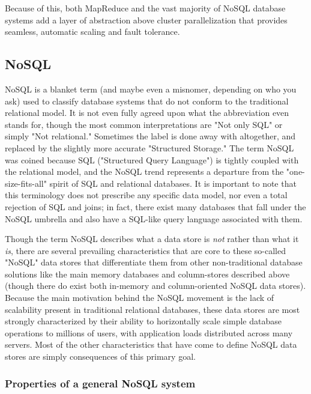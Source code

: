 \documentclass[11pt,a4paper]{report}
\begin{document}
Because of this, both MapReduce and the vast majority of NoSQL database systems add a layer of abstraction above cluster parallelization that provides seamless, automatic scaling and fault tolerance.
\subsection*{NoSQL}
NoSQL is a blanket term (and maybe even a misnomer, depending on who you ask) used to classify database systems that do not conform to the traditional relational model. It is not even fully agreed upon what the abbreviation even stands for, though the most common interpretations are "Not only SQL" or simply "Not relational."\cite{cattell2011scalable} Sometimes the label is done away with altogether, and replaced by the slightly more accurate "Structured Storage." The term NoSQL was coined because SQL ("Structured Query Language") is tightly coupled with the relational model, and the NoSQL trend represents a departure from the "one-size-fits-all" spirit of SQL and relational databases. It is important to note that this terminology does not prescribe any specific data model, nor even a total rejection of SQL and joins; in fact, there exist many databases that fall under the NoSQL umbrella and also have a SQL-like query language associated with them. 

Though the term NoSQL describes what a data store is \textit{not} rather than what it \textit{is}, there are several prevailing characteristics that are core to these so-called "NoSQL" data stores that differentiate them from other non-traditional database solutions like the main memory databases and column-stores described above (though there do exist both in-memory and column-oriented NoSQL data stores). Because the main motivation behind the NoSQL movement is the lack of scalability present in traditional relational databases, these data stores are most strongly characterized by their ability to horizontally scale simple database operations to millions of users, with application loads distributed across many servers.\cite{strauch2011nosql} Most of the other characteristics that have come to define NoSQL data stores are simply consequences of this primary goal.

\subsubsection{Properties of a  general NoSQL system}
\end{document}
